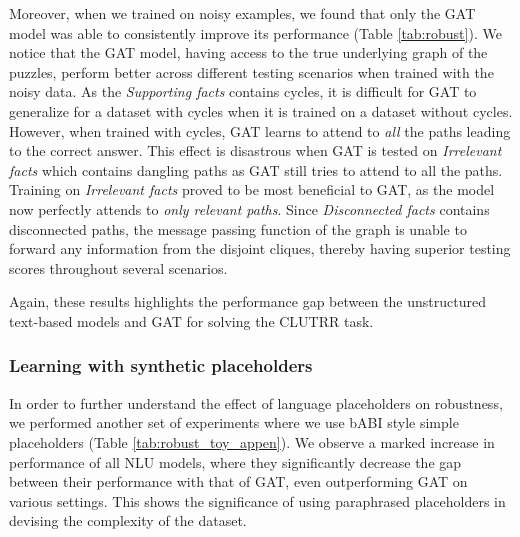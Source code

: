 \documentclass[letterpaper, 12pt]{report}
\begin{document}
Moreover, when we trained on noisy examples, we found that only the GAT model was able to consistently improve its performance (Table \ref{tab:robust}).
We notice that the GAT model, having access to the true underlying graph of the puzzles, perform better across different testing scenarios when trained with the noisy data. As the \textit{Supporting facts} contains cycles, it is difficult for GAT to generalize for a dataset with cycles when it is trained on a dataset without cycles. However, when trained with cycles, GAT learns to attend to \textit{all} the paths leading to the correct answer. This effect is disastrous when GAT is tested on \textit{Irrelevant facts} which contains dangling paths as GAT still tries to attend to all the paths. Training on \textit{Irrelevant facts} proved to be most beneficial to GAT, as the model now perfectly attends to \textit{only relevant paths}.
Since \textit{Disconnected facts} contains disconnected paths, the message passing function of the graph is unable to forward any information from the disjoint cliques, thereby having superior testing scores throughout several scenarios.



Again, these results highlights the performance gap between the unstructured text-based models and GAT for solving the CLUTRR task.

\subsubsection{Learning with synthetic placeholders}

In order to further understand the effect of language placeholders on robustness, we performed another set of experiments where we use bABI \cite{Weston2015-is} style simple placeholders (Table \ref{tab:robust_toy_appen}). We observe a marked increase in performance of all NLU models, where they significantly decrease the gap between their performance with that of GAT, even outperforming GAT on various settings. This shows the significance of using paraphrased placeholders in devising the complexity of the dataset.







\end{document}
